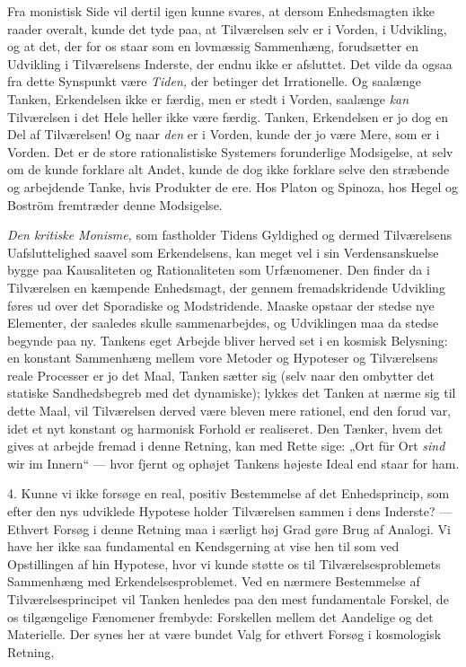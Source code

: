 \documentclass[12pt,a4paper,openany]{book}
\newcommand{\opage}[1]{\marginnote{\footnotesize\textit{[#1]}}}
\begin{document}
Fra monistisk Side vil dertil igen kunne svares, at dersom Enhedsmagten ikke
raader overalt, kunde det tyde paa, at Tilværelsen selv er i Vorden, i
Udvikling, og at det, der for os staar som en lovmæssig Sammenhæng, forudsætter
en Udvikling i Tilværelsens Inderste, der endnu ikke er afsluttet. Det vilde da
ogsaa fra dette Synspunkt være \textit{Tiden,} der betinger det Irrationelle.
Og saalænge Tanken, Erkendelsen ikke er færdig,
\opage{62}men er stedt i Vorden, saalænge \textit{kan} Tilværelsen i det Hele
heller ikke være færdig. Tanken, Erkendelsen er jo dog en Del af Tilværelsen!
Og naar \textit{den} er i Vorden, kunde der jo være Mere, som er i Vorden. Det
er de store rationalistiske Systemers forunderlige Modsigelse, at selv om de
kunde forklare alt Andet, kunde de dog ikke forklare selve den stræbende og
arbejdende Tanke, hvis Produkter de ere. Hos Platon og Spinoza, hos Hegel og
Boström fremtræder denne Modsigelse.

\textit{Den kritiske Monisme,} som fastholder Tidens Gyldighed og dermed
Tilværelsens Uafsluttelighed saavel som Erkendelsens, kan meget vel i sin
Verdensanskuelse bygge paa Kausaliteten og Rationaliteten som Urfænomener. Den
finder da i Tilværelsen en kæmpende Enhedsmagt, der gennem fremadskridende
Udvikling føres ud over det Sporadiske og Modstridende. Maaske opstaar der
stedse nye Elementer, der saaledes skulle sammenarbejdes, og Udviklingen maa da
stedse begynde paa ny. Tankens eget Arbejde bliver herved set i en kosmisk
Belysning: en konstant Sammenhæng mellem vore Metoder og Hypoteser og
Tilværelsens reale Processer er jo det Maal, Tanken sætter sig (selv naar den
ombytter det statiske Sandhedsbegreb med det dynamiske); lykkes det Tanken at
nærme sig til dette Maal, vil Tilværelsen derved være bleven mere rationel, end
den forud var, idet et nyt konstant og harmonisk Forhold er realiseret. Den
Tænker, hvem det gives at arbejde fremad i denne Retning, kan med Rette sige:
„Ort für Ort \textit{sind} wir im Innern“ --- hvor fjernt og ophøjet Tankens
højeste Ideal end staar for ham.

4. Kunne vi ikke forsøge en real, positiv Bestemmelse af det Enhedsprincip, som
efter den nys udviklede Hypotese holder Tilværelsen sammen i dens Inderste? ---
Ethvert Forsøg i denne Retning maa i særligt høj Grad gøre Brug af Analogi. Vi
have her ikke saa fundamental en Kendsgerning at vise hen til som ved
Opstillingen af hin Hypotese, hvor vi kunde støtte os til Tilværelsesproblemets
Sammenhæng med Erkendelsesproblemet. Ved en nærmere Bestemmelse af
Tilværelsesprincipet vil Tanken henledes paa den mest fundamentale Forskel, de
os tilgængelige Fænomener frembyde: Forskellen mellem det Aandelige og
\opage{63}det Materielle. Der synes her at være bundet Valg for ethvert Forsøg
i kosmologisk Retning,
\end{document}

